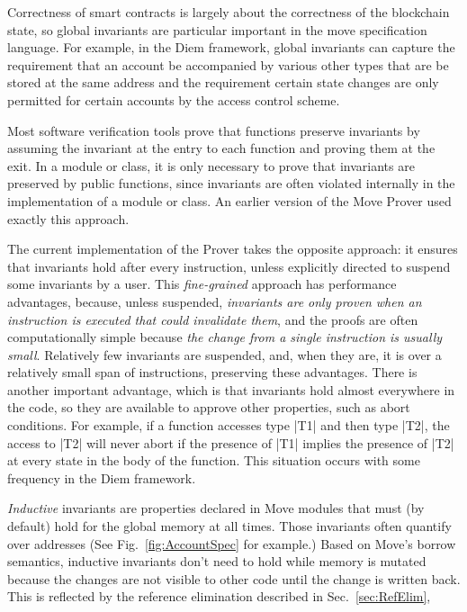 Correctness of smart contracts is largely about the correctness of the
blockchain state, so global invariants are particular important in the
move specification language.  For example, in the Diem framework,
global invariants can capture the requirement that an account be
accompanied by various other types that are be stored at the same
address and the requirement certain state changes are only permitted
for certain accounts by the access control scheme.

Most software verification tools prove that functions preserve
invariants by assuming the invariant at the entry to each function and
proving them at the exit.  In a module or class, it is only necessary
to prove that invariants are preserved by public functions, since
invariants are often violated internally in the implementation of a module or
class. An earlier version of the Move Prover used exactly this approach.

The current implementation of the Prover takes the opposite approach: it ensures
that invariants hold after every instruction, unless explicitly directed to
suspend some invariants by a user.  This \emph{fine-grained} approach has
performance advantages, because, unless suspended, \emph{invariants are only
  proven when an instruction is executed that could invalidate them}, and the
proofs are often computationally simple because \emph{the change from a single
  instruction is usually small}.  Relatively few invariants are suspended, and,
when they are, it is over a relatively small span of instructions, preserving
these advantages.  There is another important advantage, which is that
invariants hold almost everywhere in the code, so they are available to approve
other properties, such as abort conditions. For example, if a function accesses
type |T1| and then type |T2|, the access to |T2| will never abort if the
presence of |T1| implies the presence of |T2| at every state in the body of the
function.  This situation occurs with some frequency in the Diem framework.



\emph{Inductive} invariants are properties declared in Move modules that must
(by default) hold for the global memory at all times. Those invariants often
quantify over addresses (See Fig.~\ref{fig:AccountSpec} for example.) Based on
Move's borrow semantics, inductive invariants don't need to hold while memory is
mutated because the changes are not visible to other code until the change is written back.
This is reflected by the reference elimination described in
Sec.~\ref{sec:RefElim},

